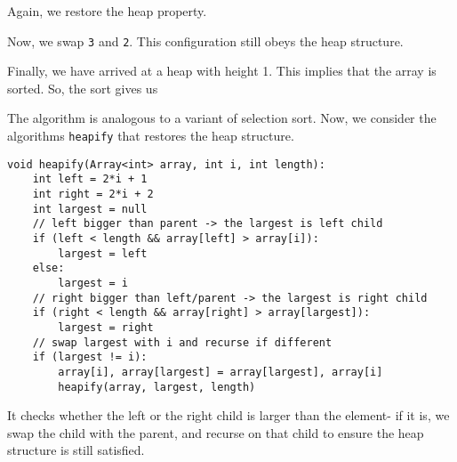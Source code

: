 \documentclass[a4paper, openany]{memoir}
\begin{document}
Again, we restore the heap property.
\begin{center}
\end{center}
Now, we swap \texttt{3} and \texttt{2}. This configuration still obeys the heap structure.
\begin{center}
\end{center}
Finally, we have arrived at a heap with height 1. This implies that the array is sorted. So, the sort gives us
\begin{center}
\end{center}
The algorithm is analogous to a variant of selection sort. Now, we consider the algorithms \texttt{heapify} that restores the heap structure. 
\begin{lstlisting}[language=pseudocode]
void heapify(Array<int> array, int i, int length):
    int left = 2*i + 1
    int right = 2*i + 2
    int largest = null
    // left bigger than parent -> the largest is left child
    if (left < length && array[left] > array[i]):
        largest = left
    else:
        largest = i
    // right bigger than left/parent -> the largest is right child
    if (right < length && array[right] > array[largest]):
        largest = right
    // swap largest with i and recurse if different
    if (largest != i):
        array[i], array[largest] = array[largest], array[i]
        heapify(array, largest, length)
\end{lstlisting}
It checks whether the left or the right child is larger than the element- if it is, we swap the child with the parent, and recurse on that child to ensure the heap structure is still satisfied.
\end{document}
